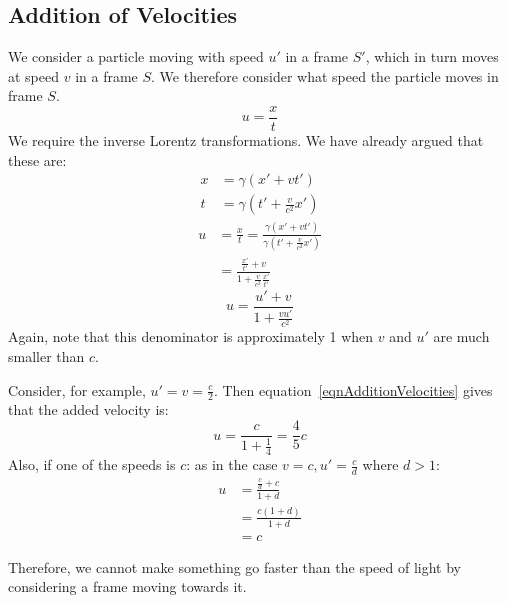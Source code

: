 \documentclass[../Main.tex]{subfiles}
\begin{document}
\subsection{Addition of Velocities}
We consider a particle moving with speed $u'$ in a frame $S'$, which in turn moves at speed $v$ in a frame $S$. We therefore consider what speed the particle moves in frame $S$.
\begin{equation*}
    u = \frac{x}{t}
\end{equation*}
We require the inverse Lorentz transformations. We have already argued that these are:
\begin{align*}
    x &= \gamma (x' + vt') \\
    t &= \gamma (t' + \frac{v}{c^2}x')
\end{align*}
\begin{align*}
    u &= \frac{x}{t} = \frac{\gamma(x' + vt')}{\gamma(t' + \frac{v}{c^2}x')} \\
    &= \frac{\frac{x'}{t'} + v}{1 + \frac{v}{c^2}\frac{x'}{t'}}
\end{align*}
\begin{equation}
    u = \frac{u' + v}{1 + \frac{vu'}{c^2}}
    \label{eqnAdditionVelocities}
\end{equation}
Again, note that this denominator is approximately 1 when $v$ and $u'$ are much smaller than $c$.
\begin{example}
    Consider, for example, $u' = v = \frac{c}{2}$. Then equation~\ref{eqnAdditionVelocities} gives that the added velocity is:
    \begin{equation*}
        u = \frac{c}{1 + \frac{1}{4}} = \frac{4}{5} c
    \end{equation*}
    Also, if one of the speeds is $c$: as in the case $v = c, u' = \frac{c}{d}$ where $d > 1$:
    \begin{align*}
        u &= \frac{\frac{c}{d} + c}{1 + d} \\
        &= \frac{c(1 + d)}{1 + d} \\
        &= c
    \end{align*}
\end{example}
Therefore, we cannot make something go faster than the speed of light by considering a frame moving towards it.
\end{document}
